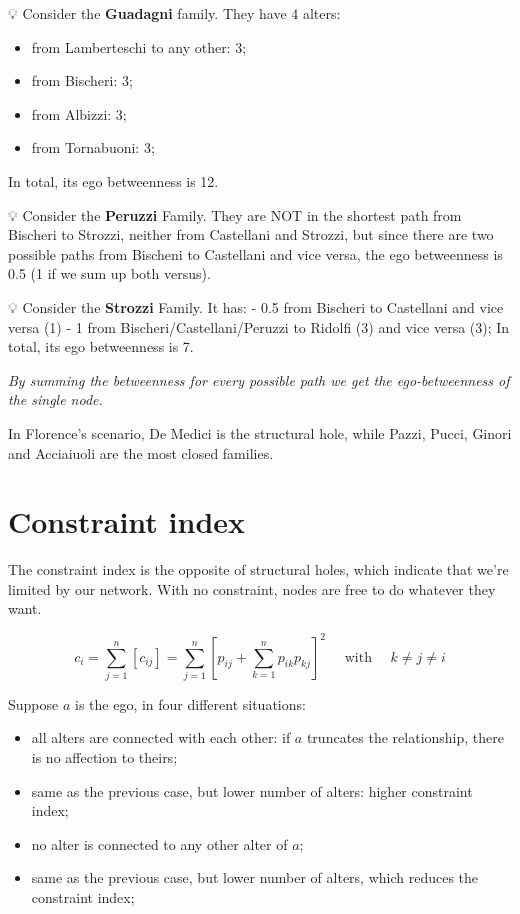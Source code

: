 \documentclass[
  notitlepage,
  onecolumn,
  openany]{book}
\providecommand{\tightlist}{%
  \setlength{\itemsep}{0pt}\setlength{\parskip}{0pt}}
\begin{document}
💡 Consider the \textbf{Guadagni} family. They have 4 alters:

\begin{itemize}
\tightlist
\item
  from Lamberteschi to any other: 3;
\item
  from Bischeri: 3;
\item
  from Albizzi: 3;
\item
  from Tornabuoni: 3;
\end{itemize}

In total, its ego betweenness is 12.

💡 Consider the \textbf{Peruzzi} Family. They are NOT in the shortest path from Bischeri to Strozzi, neither from Castellani and Strozzi, but since there are two possible paths from Bischeni to Castellani and vice versa, the ego betweenness is 0.5 (1 if we sum up both versus).

💡 Consider the \textbf{Strozzi} Family. It has:
- 0.5 from Bischeri to Castellani and vice versa (1)
- 1 from Bischeri/Castellani/Peruzzi to Ridolfi (3) and vice versa (3);
In total, its ego betweenness is 7.

\emph{By summing the betweenness for every possible path we get the ego-betweenness of the single node.}

In Florence's scenario, De Medici is the structural hole, while Pazzi, Pucci, Ginori and Acciaiuoli are the most closed families.

\hypertarget{constraint-index}{%
\section{Constraint index}\label{constraint-index}}

The constraint index is the opposite of structural holes, which indicate that we're limited by our network. With no constraint, nodes are free to do whatever they want.

\[
c_{i}=\sum_{j=1}^{n}\left[c_{i j}\right]=\sum_{j=1}^{n}\left[p_{i j}+\sum_{k=1}^{n} p_{i k} p_{k j}\right]^{2} \quad \text { with } \quad k \neq j \neq i
\]

Suppose \(a\) is the ego, in four different situations:

\begin{itemize}
\tightlist
\item
  all alters are connected with each other: if \(a\) truncates the relationship, there is no affection to theirs;
\item
  same as the previous case, but lower number of alters: higher constraint index;
\item
  no alter is connected to any other alter of \(a\);
\item
  same as the previous case, but lower number of alters, which reduces the constraint index;
\end{itemize}
\end{document}
